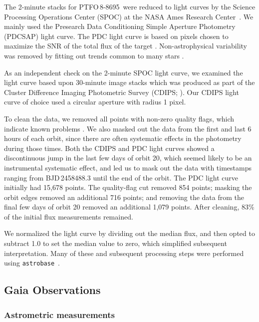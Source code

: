 \documentclass[12pt,twocolumn,tighten]{aastex62}
\newcommand{\ptfo}{PTFO$\,$8-8695}
\begin{document}
The 2-minute stacks for \ptfo\ were reduced to light curves by the
Science Processing Operations Center (SPOC) at the NASA Ames Research
Center~\citep{jenkins_tess_2016}.  We mainly used the Presearch Data
Conditioning Simple Aperture Photometry (PDCSAP) light curve.  The PDC
light curve is based on pixels chosen to maximize the SNR of the total
flux of the target \citep{bryson_2020_target_aperture}.
Non-astrophysical variability was removed by fitting out trends common
to many stars \citep{smith_kepler_2012,stumpe_multiscale_2014}.

As an independent check on the 2-minute SPOC light curve, we examined
the light curve based upon 30-minute image stacks which was produced
as part of the Cluster Difference Imaging Photometric Survey (CDIPS;
\citealt{bouma_cluster_2019}).  Our CDIPS light curve of choice used a
circular aperture with radius 1 pixel.

To clean the data, we removed all points with non-zero quality flags,
which indicate known problems \citep[{\it
e.g.},][]{tess_data_product_description_2018}.  We also masked out the
data from the first and last 6 hours of each orbit, since there are
often systematic effects in the photometry during those times.  Both
the CDIPS and PDC light curves showed a discontinuous jump in the last
few days of orbit 20, which seemed likely to be an instrumental
systematic effect, and led us to mask out the data with timestamps
ranging from BJD\,2458488.3 until the end of the orbit.  The PDC light
curve initially had 15{,}678 points.  The quality-flag cut removed 854
points; masking the orbit edges removed an additional 716 points; and
removing the data from the final few days of orbit 20 removed an
additional 1{,}079 points.  After cleaning, 83\% of the initial flux
measurements remained.

We normalized the light curve by dividing out the median flux, and
then opted to subtract 1{.}0 to set the median value to zero, which
simplified subsequent interpretation.  Many of these and subsequent
processing steps were performed using
\texttt{astrobase}~\citep{bhatti_astrobase_2018}. 


\subsection{Gaia Observations}

\subsubsection{Astrometric measurements}
\end{document}
